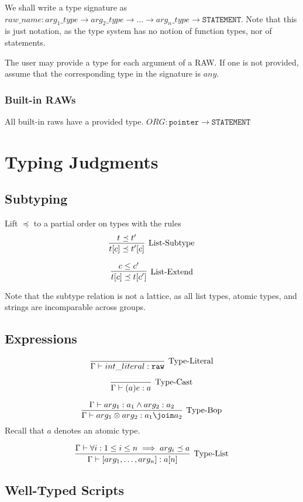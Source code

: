 \documentclass[10pt,a4paper]{article}
\begin{document}
We shall write a type signature as $raw\_name : arg_1\_type \rightarrow arg_2\_type \rightarrow \dots \rightarrow arg_n\_type \rightarrow \texttt{STATEMENT}$. Note that this is just notation, as the type system has no notion of function types, nor of statements.

The user may provide a type for each argument of a RAW. If one is not provided, assume that the corresponding type in the signature is $any$.

\subsubsection{Built-in RAWs}
All built-in raws have a provided type.
$ORG : \texttt{pointer} \rightarrow \texttt{STATEMENT}$

\section{Typing Judgments}
\subsection{Subtyping}
Lift $\preceq$ to a partial order on types with the rules
$$
\infer[\text{List-Subtype}]
{t[c] \preceq t'[c]}
{t \preceq t'}
$$

$$
\infer[\text{List-Extend}]
{t[c] \preceq t[c']}
{c \leq c'}
$$

Note that the subtype relation is not a lattice, as all list types, atomic types, and strings are incomparable across groups.

\subsection{Expressions}
$$
\infer[\text{Type-Literal}]
{\Gamma \vdash int\_literal : \texttt{raw}}
{}
$$

$$
\infer[\text{Type-Cast}]
{\Gamma \vdash (a)e : a}
{}
$$

$$
\infer[\text{Type-Bop}]
{\Gamma \vdash arg_1 \otimes arg_2 : a_1 \join a_2}
{\Gamma \vdash arg_1 : a_1 \wedge arg_2 : a_2}
$$
Recall that $a$ denotes an atomic type.

$$
\infer[\text{Type-List}]
{\Gamma \vdash [arg_1, \dots, arg_n] : a[n]}
{\Gamma \vdash \forall i: 1 \leq i \leq n \implies arg_i \preceq a}
$$

\subsection{Well-Typed Scripts}
\end{document}
